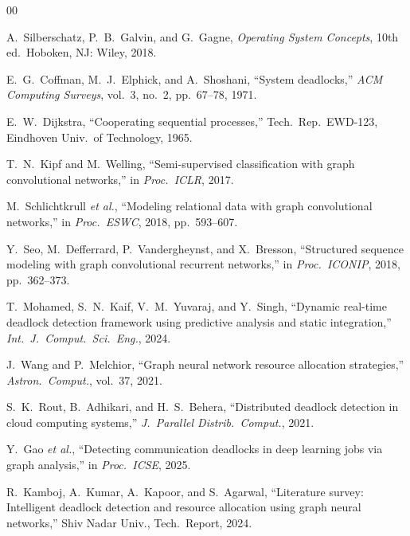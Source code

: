 \documentclass[conference]{IEEEtran}
\begin{document}
\begin{thebibliography}{00}

A.\ Silberschatz, P.\ B.\ Galvin, and G.\ Gagne,
\textit{Operating System Concepts}, 10th ed.\ Hoboken, NJ: Wiley, 2018.

E.\ G.\ Coffman, M.\ J.\ Elphick, and A.\ Shoshani,
``System deadlocks,''
\textit{ACM Computing Surveys}, vol.\ 3, no.\ 2, pp.\ 67--78, 1971.

E.\ W.\ Dijkstra,
``Cooperating sequential processes,''
Tech.\ Rep.\ EWD-123, Eindhoven Univ.\ of Technology, 1965.

T.\ N.\ Kipf and M.\ Welling,
``Semi-supervised classification with graph convolutional networks,''
in \textit{Proc.\ ICLR}, 2017.

M.\ Schlichtkrull \textit{et al.},
``Modeling relational data with graph convolutional networks,''
in \textit{Proc.\ ESWC}, 2018, pp.\ 593--607.

Y.\ Seo, M.\ Defferrard, P.\ Vandergheynst, and X.\ Bresson,
``Structured sequence modeling with graph convolutional recurrent networks,''
in \textit{Proc.\ ICONIP}, 2018, pp.\ 362--373.

T.\ Mohamed, S.\ N.\ Kaif, V.\ M.\ Yuvaraj, and Y.\ Singh,
``Dynamic real-time deadlock detection framework using predictive analysis
and static integration,''
\textit{Int.\ J.\ Comput.\ Sci.\ Eng.}, 2024.

J.\ Wang and P.\ Melchior,
``Graph neural network resource allocation strategies,''
\textit{Astron.\ Comput.}, vol.\ 37, 2021.

S.\ K.\ Rout, B.\ Adhikari, and H.\ S.\ Behera,
``Distributed deadlock detection in cloud computing systems,''
\textit{J.\ Parallel Distrib.\ Comput.}, 2021.

Y.\ Gao \textit{et al.},
``Detecting communication deadlocks in deep learning jobs via graph analysis,''
in \textit{Proc.\ ICSE}, 2025.

R.\ Kamboj, A.\ Kumar, A.\ Kapoor, and S.\ Agarwal,
``Literature survey: Intelligent deadlock detection and resource allocation
using graph neural networks,''
Shiv Nadar Univ., Tech.\ Report, 2024.

\end{thebibliography}
\end{document}
